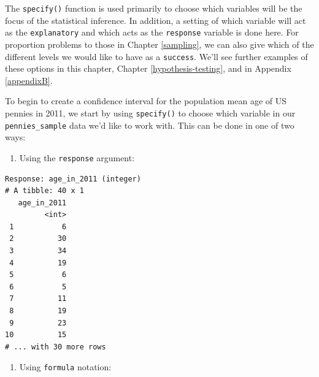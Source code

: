 \documentclass[12pt,]{krantz}
\makeatletter
\newenvironment{Shaded}{\begin{snugshade}}{\end{snugshade}}
\newcommand{\KeywordTok}[1]{\textcolor[rgb]{0.27,0.27,0.27}{\textbf{#1}}}
\newcommand{\DataTypeTok}[1]{\textcolor[rgb]{0.27,0.27,0.27}{#1}}
\newcommand{\DecValTok}[1]{\textcolor[rgb]{0.06,0.06,0.06}{#1}}
\newcommand{\StringTok}[1]{\textcolor[rgb]{0.5,0.5,0.5}{#1}}
\newcommand{\OtherTok}[1]{\textcolor[rgb]{0.37,0.37,0.37}{#1}}
\newcommand{\OperatorTok}[1]{\textcolor[rgb]{0.43,0.43,0.43}{\textbf{#1}}}
\newcommand{\NormalTok}[1]{#1}
\providecommand{\tightlist}{%
  \setlength{\itemsep}{0pt}\setlength{\parskip}{0pt}}
\newenvironment{kframe}{%
\medskip{}
\setlength{\fboxsep}{.8em}
 \def\at@end@of@kframe{}%
 \ifinner\ifhmode%
  \def\at@end@of@kframe{\end{minipage}}%
  \begin{minipage}{\columnwidth}%
 \fi\fi%
 \def\FrameCommand##1{\hskip\@totalleftmargin \hskip-\fboxsep
 \colorbox{shadecolor}{##1}\hskip-\fboxsep
     \hskip-\linewidth \hskip-\@totalleftmargin \hskip\columnwidth}%
 \MakeFramed {\advance\hsize-\width
   \@totalleftmargin\z@ \linewidth\hsize
   \@setminipage}}%
 {\par\unskip\endMakeFramed%
 \at@end@of@kframe}
\renewenvironment{Shaded}{\begin{kframe}}{\end{kframe}}
\makeatother
\begin{document}
The \texttt{specify()} function is used primarily to choose which
variables will be the focus of the statistical inference. In addition, a
setting of which variable will act as the \texttt{explanatory} and which
acts as the \texttt{response} variable is done here. For proportion
problems to those in Chapter \ref{sampling}, we can also give which of
the different levels we would like to have as a \texttt{success}. We'll
see further examples of these options in this chapter, Chapter
\ref{hypothesis-testing}, and in Appendix \ref{appendixB}.

To begin to create a confidence interval for the population mean age of
US pennies in 2011, we start by using \texttt{specify()} to choose which
variable in our \texttt{pennies\_sample} data we'd like to work with.
This can be done in one of two ways:

\begin{enumerate}
\def\labelenumi{\arabic{enumi}.}
\tightlist
\item
  Using the \texttt{response} argument:
\end{enumerate}

\begin{Shaded}
\end{Shaded}

\begin{verbatim}
Response: age_in_2011 (integer)
# A tibble: 40 x 1
   age_in_2011
         <int>
 1           6
 2          30
 3          34
 4          19
 5           6
 6           5
 7          11
 8          19
 9          23
10          15
# ... with 30 more rows
\end{verbatim}

\begin{enumerate}
\def\labelenumi{\arabic{enumi}.}
\setcounter{enumi}{1}
\tightlist
\item
  Using \texttt{formula} notation:
\end{enumerate}

\begin{Shaded}
\end{Shaded}
\end{document}

